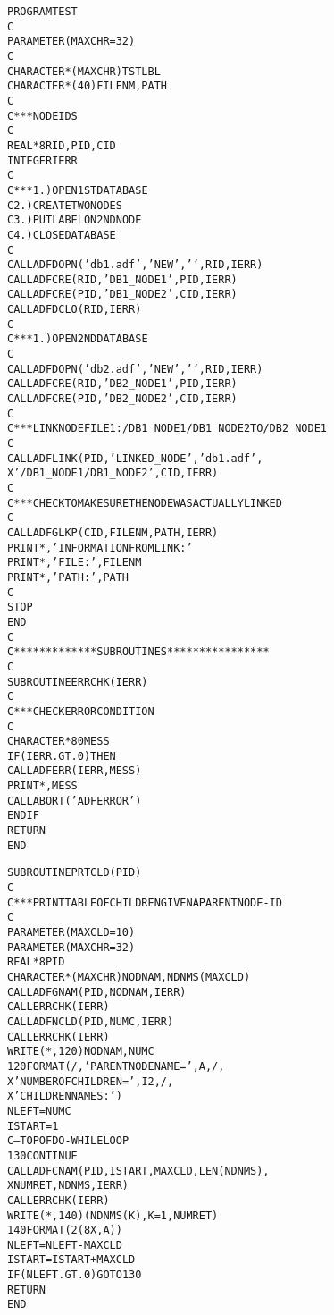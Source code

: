 \begin{alltt}
   PROGRAM TEST
   C
         PARAMETER (MAXCHR=32)
   C
         CHARACTER*(MAXCHR) TSTLBL
         CHARACTER*(40) FILENM,PATH
   C
   C *** NODE IDS
   C
         REAL*8 RID,PID,CID
         INTEGER IERR
   C
   C *** 1.) OPEN 1ST DATABASE
   C     2.) CREATE TWO NODES
   C     3.) PUT LABEL ON 2ND NODE
   C     4.) CLOSE DATABASE
   C
         CALL ADFDOPN('db1.adf','NEW',' ',RID,IERR)
         CALL ADFCRE(RID,'DB1_NODE1',PID,IERR)
         CALL ADFCRE(PID,'DB1_NODE2',CID,IERR)
         CALL ADFDCLO(RID,IERR)
   C
   C *** 1.) OPEN 2ND DATABASE
   C
         CALL ADFDOPN('db2.adf','NEW',' ',RID,IERR)
         CALL ADFCRE(RID,'DB2_NODE1',PID,IERR)
         CALL ADFCRE(PID,'DB2_NODE2',CID,IERR)
   C
   C *** LINK NODE FILE 1:/DB1_NODE1/DB1_NODE2 TO /DB2_NODE1
   C
         CALL ADFLINK(PID,'LINKED_NODE','db1.adf',
        X             '/DB1_NODE1/DB1_NODE2',CID,IERR)
   C
   C *** CHECK TO MAKE SURE THE NODE WAS ACTUALLY LINKED
   C
         CALL ADFGLKP(CID,FILENM,PATH,IERR)
         PRINT *,' INFORMATION FROM LINK:'
         PRINT *,' FILE: ',FILENM
         PRINT *,' PATH: ',PATH
   C
         STOP
         END
   C
   C ************* SUBROUTINES ****************
   C
         SUBROUTINE ERRCHK(IERR)
   C
   C *** CHECK ERROR CONDITION
   C
         CHARACTER*80 MESS
         IF (IERR .GT. 0) THEN
            CALL ADFERR(IERR,MESS)
            PRINT *,MESS
            CALL ABORT('ADF ERROR')
         ENDIF
         RETURN
         END

         SUBROUTINE PRTCLD(PID)
   C
   C *** PRINT TABLE OF CHILDREN GIVEN A PARENT NODE-ID
   C
         PARAMETER (MAXCLD=10)
         PARAMETER (MAXCHR=32)
         REAL*8 PID
         CHARACTER*(MAXCHR) NODNAM,NDNMS(MAXCLD)
         CALL ADFGNAM(PID,NODNAM,IERR)
         CALL ERRCHK(IERR)
         CALL ADFNCLD(PID,NUMC,IERR)
         CALL ERRCHK(IERR)
         WRITE(*,120)NODNAM,NUMC
     120 FORMAT(/,' PARENT NODE NAME = ',A,/,
        X       '     NUMBER OF CHILDREN = ',I2,/,
        X       '     CHILDREN NAMES:')
         NLEFT = NUMC
         ISTART = 1
   C     --- TOP OF DO-WHILE LOOP
     130 CONTINUE
            CALL ADFCNAM(PID,ISTART,MAXCLD,LEN(NDNMS),
        X                NUMRET,NDNMS,IERR)
            CALL ERRCHK(IERR)
            WRITE(*,140)(NDNMS(K),K=1,NUMRET)
     140    FORMAT(2(8X,A))
            NLEFT = NLEFT - MAXCLD
            ISTART = ISTART + MAXCLD
         IF (NLEFT .GT. 0) GO TO 130
         RETURN
         END
\end{alltt}

